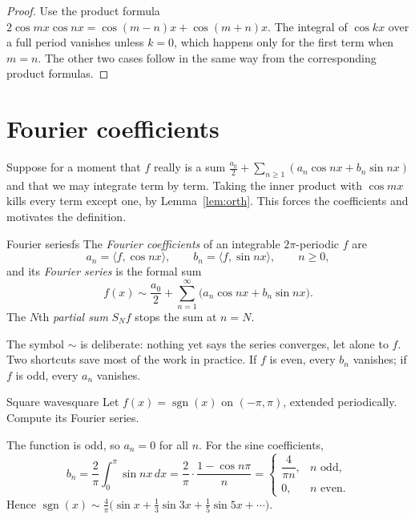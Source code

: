 \documentclass[11pt]{article}
\begin{document}
\begin{proof}
Use the product formula
$2\cos mx\cos nx = \cos(m-n)x + \cos(m+n)x$. The integral of $\cos kx$ over a
full period vanishes unless $k=0$, which happens only for the first term when
$m=n$. The other two cases follow in the same way from the corresponding
product formulas.
\end{proof}

\section{Fourier coefficients}

Suppose for a moment that $f$ really is a sum
$\tfrac{a_0}{2}+\sum_{n\ge1}(a_n\cos nx + b_n\sin nx)$ and that we may
integrate term by term. Taking the inner product with $\cos mx$ kills every
term except one, by Lemma~\ref{lem:orth}. This forces the coefficients and motivates
the definition.

\begin{definition}{Fourier series}{fs}
The \emph{Fourier coefficients} of an integrable $2\pi$-periodic $f$ are
\[
  a_n = \langle f, \cos nx\rangle, \qquad b_n = \langle f, \sin nx\rangle,
  \qquad n \ge 0,
\]
and its \emph{Fourier series} is the formal sum
\begin{equation}\label{eq:fs}
  f(x) \sim \frac{a_0}{2} + \sum_{n=1}^{\infty}\bigl(a_n\cos nx + b_n\sin nx\bigr).
\end{equation}
The $N$th \emph{partial sum} $S_N f$ stops the sum at $n=N$.
\end{definition}

The symbol $\sim$ is deliberate: nothing yet says the series converges, let
alone to $f$. Two shortcuts save most of the work in practice. If $f$ is even,
every $b_n$ vanishes; if $f$ is odd, every $a_n$ vanishes.

\begin{example}{Square wave}{square}
Let $f(x)=\operatorname{sgn}(x)$ on $(-\pi,\pi)$, extended periodically.
Compute its Fourier series.
\begin{solution}
The function is odd, so $a_n=0$ for all $n$. For the sine coefficients,
\[
  b_n = \frac{2}{\pi}\int_0^{\pi}\sin nx\,dx
      = \frac{2}{\pi}\cdot\frac{1-\cos n\pi}{n}
      = \begin{cases} \dfrac{4}{\pi n}, & n \text{ odd},\\[4pt]
                      0, & n \text{ even}.\end{cases}
\]
Hence
$\operatorname{sgn}(x) \sim \frac{4}{\pi}\bigl(\sin x + \tfrac13\sin 3x
+ \tfrac15\sin 5x + \cdots\bigr)$.
\end{solution}
\end{example}
\end{document}

